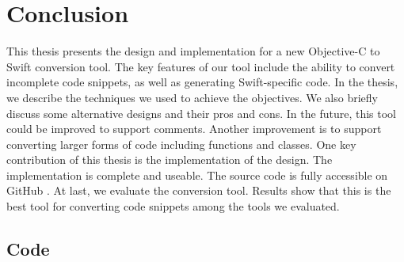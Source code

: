 \documentclass{sfuthesis}
\begin{document}
\chapter{Conclusion}

This thesis presents the design and implementation for a new Objective-C to Swift conversion tool. The key features of our tool include the ability to convert incomplete code snippets, as well as generating Swift-specific code. In the thesis, we describe the techniques we used to achieve the objectives. We also briefly discuss some alternative designs and their pros and cons. In the future, this tool could be improved to support comments. Another improvement is to support converting larger forms of code including functions and classes.
One key contribution of this thesis is the implementation of the design. The implementation is complete and useable. The source code is fully accessible on GitHub \cite{babelswift}. At last, we evaluate the conversion tool. Results show that this is the best tool for converting code snippets among the tools we evaluated.


%
%
%
%
%

\backmatter%
	
	

\begin{appendices} %
	\chapter{Code}
\end{appendices}
\end{document}
